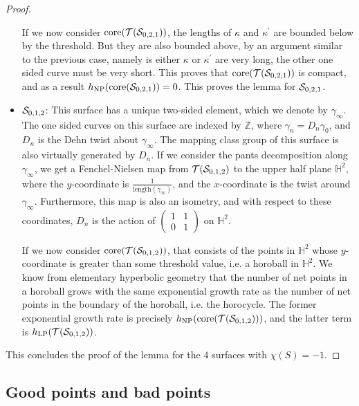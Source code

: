 \documentclass[12pt, reqno]{amsart}
\begin{document}
\begin{proof}
\begin{itemize}
    If we now consider $\mathrm{core}(\mathcal{T}(\mathcal{S}_{0,2,1}))$, the lengths of $\kappa$ and $\kappa^{\prime}$ are bounded below by the threshold.
    But they are also bounded above, by an argument similar to the previous case, namely is either $\kappa$ or $\kappa^{\prime}$ are very long, the other one sided curve must be very short.
    This proves that $\mathrm{core}(\mathcal{T}(\mathcal{S}_{0,2,1}))$ is compact, and as a result $h_{\mathrm{NP}}(\mathrm{core}(\mathcal{S}_{0,2,1})) = 0$.
    This proves the lemma for $\mathcal{S}_{0,2,1}$.
  \item $\mathcal{S}_{0,1,2}$: This surface has a unique two-sided element, which we denote by $\gamma_{\infty}$.
    The one sided curves on this surface are indexed by $\mathbb{Z}$, where $\gamma_n = D_n \gamma_0$, and $D_n$ is the Dehn twist about $\gamma_\infty$.
    The mapping class group of this surface is also virtually generated by $D_n$.
    If we consider the pants decomposition along $\gamma_{\infty}$, we get a Fenchel-Nielsen map from $\mathcal{T}(\mathcal{S}_{0,1,2})$ to the upper half plane $\mathbb{H}^2$, where the $y$-coordinate is $\frac{1}{\mathrm{length}(\gamma_{\infty})}$, and the $x$-coordinate is the twist around $\gamma_{\infty}$.
    Furthermore, this map is also an isometry, and with respect to these coordinates, $D_n$ is the action of $
    \begin{pmatrix}
      1 & 1 \\
      0 & 1
    \end{pmatrix}
    $ on $\mathbb{H}^2$.

    If we now consider $\mathrm{core}(\mathcal{T}(\mathcal{S}_{0,1,2}))$, that consists of the points in $\mathbb{H}^2$ whose $y$-coordinate is greater than some threshold value, i.e. a horoball in $\mathbb{H}^2$.
    We know from elementary hyperbolic geometry that the number of net points in a horoball grows with the same exponential growth rate as the number of net points in the boundary of the horoball, i.e. the horocycle.
    The former exponential growth rate is precisely $h_{\mathrm{NP}}(\mathrm{core}(\mathcal{T}(\mathcal{S}_{0,1,2})))$, and the latter term is $h_{\mathrm{LP}}(\mathcal{T}(\mathcal{S}_{0,1,2}))$.
  \end{itemize}
  This concludes the proof of the lemma for the $4$ surfaces with $\chi(S) = -1$.
\end{proof}

\subsection{Good points and bad points}
\label{sec:good-points-bad}
\end{document}
